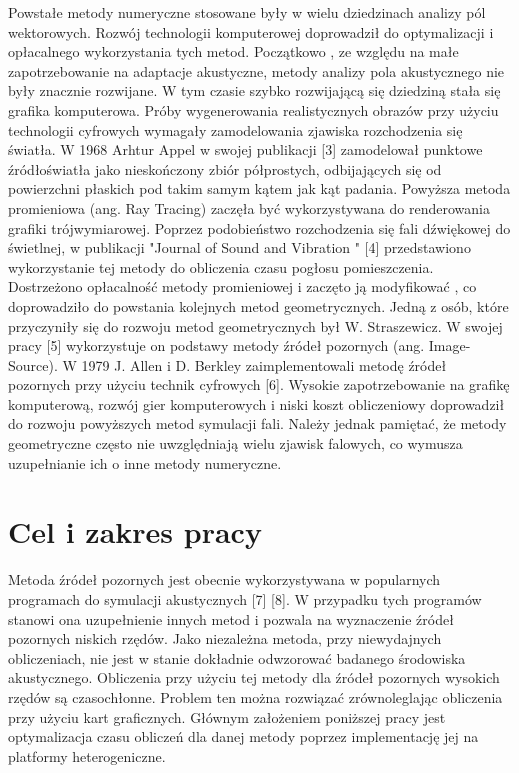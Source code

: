 Powstałe metody numeryczne stosowane były w wielu dziedzinach analizy pól wektorowych. Rozwój technologii komputerowej doprowadził do optymalizacji i opłacalnego wykorzystania tych metod. Początkowo , ze względu na małe zapotrzebowanie na adaptacje akustyczne, metody analizy pola akustycznego nie były znacznie rozwijane. W tym czasie szybko rozwijającą się dziedziną stała się grafika komputerowa. Próby wygenerowania realistycznych obrazów przy użyciu technologii cyfrowych wymagały zamodelowania zjawiska rozchodzenia się światła. W 1968 Arhtur Appel w swojej publikacji [3] zamodelował punktowe źródłoświatła jako nieskończony zbiór półprostych, odbijających się od powierzchni płaskich pod takim samym kątem jak kąt padania.  Powyższa  metoda promieniowa (ang. Ray Tracing) zaczęła być wykorzystywana do  renderowania grafiki trójwymiarowej. Poprzez podobieństwo rozchodzenia się fali dźwiękowej do świetlnej, w publikacji "Journal of Sound and Vibration " [4] przedstawiono wykorzystanie tej metody do obliczenia czasu pogłosu pomieszczenia. Dostrzeżono opłacalność metody promieniowej i zaczęto ją modyfikować , co doprowadziło do powstania kolejnych metod geometrycznych.  Jedną z osób, które przyczyniły się do rozwoju metod geometrycznych był W. Straszewicz. W swojej pracy [5] wykorzystuje  on podstawy metody źródeł pozornych (ang. Image-Source). W 1979 J. Allen i D. Berkley zaimplementowali  metodę źródeł pozornych przy użyciu technik cyfrowych [6]. Wysokie zapotrzebowanie na grafikę komputerową, rozwój gier komputerowych i niski koszt obliczeniowy doprowadził do rozwoju powyższych metod symulacji fali. Należy jednak pamiętać, że metody geometryczne często nie uwzględniają wielu zjawisk falowych, co wymusza uzupełnianie ich o inne metody numeryczne.  



\section{Cel i zakres pracy}\label{sec:celizakres}

Metoda źródeł pozornych jest obecnie wykorzystywana w popularnych programach do symulacji akustycznych [7] [8]. W przypadku tych programów stanowi ona uzupełnienie innych metod i pozwala na wyznaczenie źródeł pozornych niskich rzędów. Jako niezależna metoda, przy niewydajnych obliczeniach, nie jest w stanie dokładnie odwzorować badanego środowiska akustycznego. Obliczenia przy użyciu tej metody dla źródeł pozornych wysokich rzędów są czasochłonne. Problem ten można rozwiązać zrównoleglając obliczenia przy użyciu kart graficznych. Głównym założeniem poniższej pracy jest optymalizacja czasu obliczeń dla danej metody poprzez implementację jej na platformy heterogeniczne.

